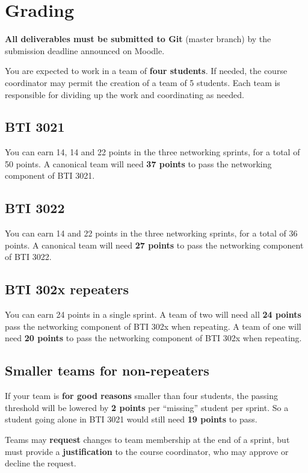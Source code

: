 \section{Grading}

{\bf All deliverables must be submitted to Git} (master branch) by the
submission deadline announced on Moodle.

You are expected to work in a team of {\bf four students}.  If needed,
the course coordinator may permit the creation of a team of 5
students.  Each team is responsible for dividing up the work and
coordinating as needed.

\subsection{BTI 3021}
You can earn 14, 14 and 22 points in the three networking sprints, for
a total of 50 points.  A canonical team will need {\bf 37 points} to
pass the networking component of BTI 3021.

\subsection{BTI 3022}
You can earn 14 and 22 points in the three networking sprints, for
a total of 36 points.  A canonical team will need {\bf 27 points} to
pass the networking component of BTI 3022.

\subsection{BTI 302x repeaters}

You can earn 24 points in a single sprint.
A team of two will need all {\bf 24 points}
pass the networking component of BTI 302x
when repeating.
A team of one will need {\bf 20 points} to
pass the networking component of BTI 302x
when repeating.

\subsection{Smaller teams for non-repeaters}

If your team is {\bf for good reasons} smaller than four students, the
passing threshold will be lowered by {\bf 2 points} per ``missing''
student per sprint.  So a student going alone in BTI 3021 would still
need {\bf 19 points} to pass.

Teams may {\bf request} changes to team membership at the end of a
sprint, but must provide a {\bf justification} to the course
coordinator, who may approve or decline the request.
